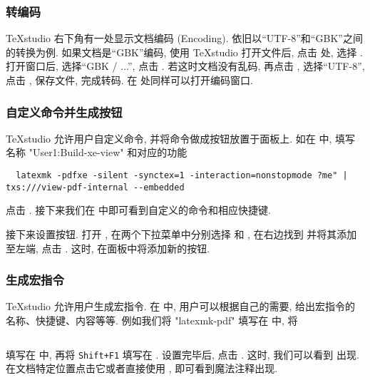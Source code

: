 \subsubsection{转编码}

\TeX studio 右下角有一处显示文档编码 (Encoding).
依旧以``UTF-8''和``GBK''之间的转换为例.
如果文档是``GBK''编码, 使用 \TeX studio 打开文件后,
点击  处, 选择 .
打开窗口后, 选择``GBK / ...'', 点击 .
若这时文档没有乱码, 再点击 ,
选择``UTF-8'', 点击 , 保存文件, 完成转码.
在  处同样可以打开编码窗口.

\subsubsection{自定义命令并生成按钮}

\TeX studio 允许用户自定义命令, 并将命令做成按钮放置于面板上.
如在  中,
填写名称 "User1:Build-xe-view"
和对应的功能
\begin{lstlisting}
  latexmk -pdfxe -silent -synctex=1 -interaction=nonstopmode ?me" | txs:///view-pdf-internal --embedded
\end{lstlisting}
点击 .
接下来我们在  中即可看到自定义的命令和相应快捷键.

接下来设置按钮.
打开 ,
在两个下拉菜单中分别选择  和 ,
在右边找到  并将其添加至左端,
点击 .
这时, 在面板中将添加新的按钮.

\subsubsection{生成宏指令}

\TeX studio 允许用户生成宏指令.
在  中, 用户可以根据自己的需要,
给出宏指令的名称、快捷键、内容等等.
例如我们将 "latexmk-pdf" 填写在  中,
将
\begin{lstlisting}[language = {[LaTeX]TeX}]
  % !TeX TXS-program:compile = txs:///latexmk/{}[-pdf -synctex=1 -interaction=nonstopmode ?me"]
\end{lstlisting}
填写在  中,
再将 \texttt{Shift+F1} 填写在 .
设置完毕后, 点击 .
这时, 我们可以看到  出现.
在文档特定位置点击它或者直接使用 , 即可看到魔法注释出现.

